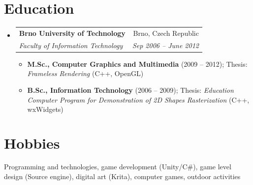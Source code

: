 \documentclass[letterpaper,11pt]{article}
\makeatletter
\newcommand{\resumeItem}[1]{
  \item\small{
    {#1 \vspace{-2pt}}
  }
}
\newcommand{\resumeSubheading}[4]{
  \vspace{-2pt}\item
    \begin{tabular*}{0.97\textwidth}[t]{l@{\extracolsep{\fill}}r}
      \textbf{#1} & #2 \\
      \textit{\small#3} & \textit{\small #4} \\
    \end{tabular*}\vspace{-7pt}
}
\newcommand{\resumeSubHeadingListStart}{\begin{itemize}[leftmargin=0.15in, label={}]}
\newcommand{\resumeSubHeadingListEnd}{\end{itemize}}
\newcommand{\resumeItemListStart}{\begin{itemize}}
\newcommand{\resumeItemListEnd}{\end{itemize}\vspace{-5pt}}
\makeatother
\begin{document}
\section{Education}
  \resumeSubHeadingListStart
    \resumeSubheading
      {Brno University of Technology}{Brno, Czech Republic}
      {Faculty of Information Technology}{Sep 2006 -- June 2012}
      \resumeItemListStart
        \resumeItem{\textbf{M.Sc., Computer Graphics and Multimedia} (2009 -- 2012); Thesis: \emph{Frameless Rendering} (C++, OpenGL)}
        \resumeItem{\textbf{B.Sc., Information Technology} (2006 -- 2009); Thesis: \emph{Education Computer Program for Demonstration of 2D Shapes Rasterization} (C++, wxWidgets)}
      \resumeItemListEnd
  \resumeSubHeadingListEnd
  
\section{Hobbies}
{Programming and technologies, game development (Unity/C\#), game level design (Source engine),  digital art (Krita), computer games, outdoor activities}

\end{document}
